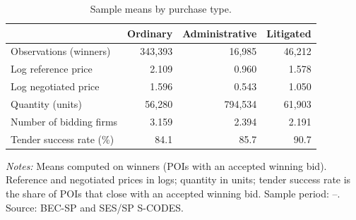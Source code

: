 \begin{table}[ht]
\centering
\caption{Sample means by purchase type.}
\label{tab:descriptive_balance}
\begin{threeparttable}
\begin{tabular}{lrrr}
\toprule
                                    & Ordinary & Administrative & Litigated \\
\midrule
Observations (winners)              & 343{,}393 & 16{,}985 & 46{,}212 \\
Log reference price                 &     2.109 &    0.960 &    1.578 \\
Log negotiated price                &     1.596 &    0.543 &    1.050 \\
Quantity (units)                    &  56{,}280 & 794{,}534 & 61{,}903 \\
Number of bidding firms             &     3.159 &    2.394 &    2.191 \\
Tender success rate (\%)            &      84.1 &     85.7 &     90.7 \\
\bottomrule
\end{tabular}
\begin{tablenotes}[flushleft]\footnotesize
\item \textit{Notes:} Means computed on winners (POIs with an
accepted winning bid). Reference and negotiated prices in logs;
quantity in units; tender success rate is the share of POIs that
close with an accepted winning bid. Sample period:
\BPsampleStartYear--\BPsampleEndYear. Source: BEC-SP and SES/SP
S-CODES.
\end{tablenotes}
\end{threeparttable}
\end{table}

